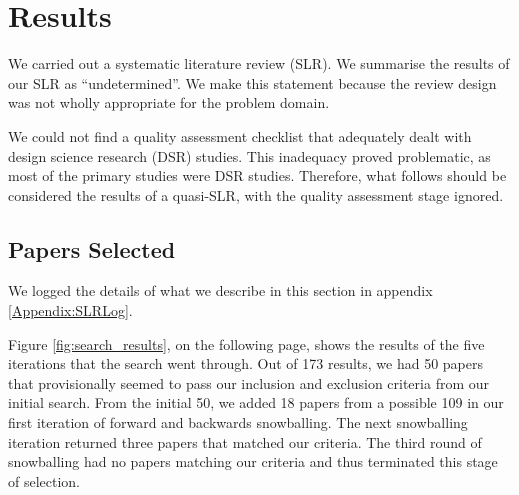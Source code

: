 \section{Results}
\label{section:slr_result}

We carried out a systematic literature review (SLR).
We summarise the results of our SLR as ``undetermined''.
We make this statement because the review design was not wholly appropriate for the problem domain.

We could not find a quality assessment checklist that adequately dealt with design science research (DSR) studies.
This inadequacy proved problematic, as most of the primary studies were DSR studies.
Therefore, what follows should be considered the results of a quasi-SLR, with the quality assessment stage ignored.

\subsection{Papers Selected}
We logged the details of what we describe in this section in appendix \ref{Appendix:SLRLog}.

Figure \ref{fig:search_results}, on the following page, shows the results of the five iterations that the search went through.
Out of 173 results, we had 50 papers that provisionally seemed to pass our inclusion and exclusion criteria from our initial search.
From the initial 50, we added 18 papers from a possible 109 in our first iteration of forward and backwards snowballing.
The next snowballing iteration returned three papers that matched our criteria.
The third round of snowballing had no papers matching our criteria and thus terminated this stage of selection.

